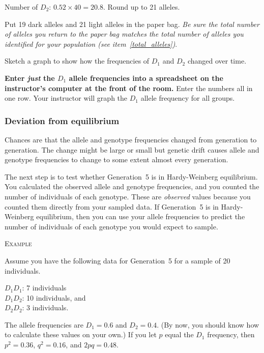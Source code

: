 \documentclass[12pt][hidelinks]{exam}
\newcommand{\allele}[1]{$#1$}
\begin{document}
\begin{questions}
	Number of \allele{D_2}: $0.52 \times 40 = 20.8.$ Round up to 21 alleles.
	
	Put 19 dark alleles and 21 light alleles in the paper bag. \emph{Be sure the total
		number of alleles you return to the paper bag matches the total number 
		of alleles you identified for your population (see item~\ref{total_alleles})}.


\question
Sketch a graph to show how the frequencies of \allele{D_1} and \allele{D_2} changed over time.

\vspace*{18\baselineskip}


\textbf{Enter \emph{just} the \allele{D_1} allele frequencies into a spreadsheet on the instructor's
computer at the front of the room.}  Enter the numbers all 
in one row. Your instructor will graph the \allele{D_1} allele frequency for 
all groups.

\subsubsection*{Deviation from equilibrium}

Chances are that the allele and genotype frequencies changed from generation to 
generation. The change might be large or small but genetic drift causes allele 
and genotype frequencies to change to some extent almost every generation.

The next step is to test whether Generation~5 is in Hardy-Weinberg equilibrium. 
You calculated the observed allele and genotype frequencies, and you counted the 
number of individuals of each genotype. These are \emph{observed} values because 
you counted them directly from your sampled data.  If Generation~5 is in 
Hardy-Weinberg equilibrium, then you can use your allele frequencies to predict 
the number of individuals of each genotype you would expect to sample. \bigskip

\textsc{Example}

\medskip

Assume you have the following data for Generation~5 for a sample of 20 individuals.

$D_1D_1$: 7 individuals  \\
$D_1D_2$: 10 individuals, and\\
$D_2D_2$: 3 individuals.

The allele frequencies are $D_1 = 0.6$ and $D_2 = 0.4$. (By now, you should 
know how to calculate these values on your own.) If you let $p$ equal the $D_1$ 
frequency, then $p^2 = 0.36$, $q^2 = 0.16$, and $2pq = 0.48$.


\end{questions}
\end{document}
